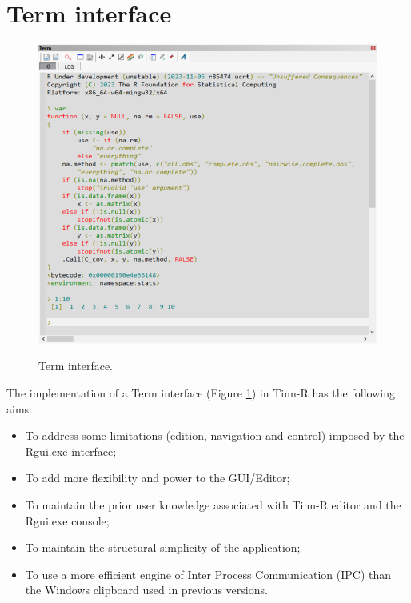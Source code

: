 
\hypertarget{working_term}{}
\section{Term interface}

\begin{figure}[H]
  \includegraphics[width=\headwidth]{./res/term.png}\\
  \caption{Term interface.}
  \label{fig:term_interface}
\end{figure}

The implementation of a Term interface
(Figure \ref{fig:term_interface})
in Tinn-R has the following aims:
\begin{itemize}
  \item To address some limitations (edition, navigation and control) imposed by the Rgui.exe interface;
  \item To add more flexibility and power to the GUI/Editor;
  \item To maintain the prior user knowledge associated with Tinn-R editor and the Rgui.exe console;
  \item To maintain the structural simplicity of the application;
  \item To use a more efficient engine of Inter Process Communication (IPC)
    than the Windows clipboard used in previous versions.
\end{itemize}

